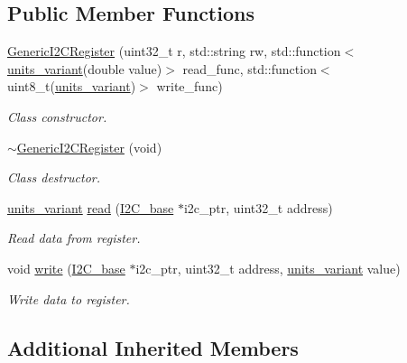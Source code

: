 \subsection*{Public Member Functions}
\begin{DoxyCompactItemize}
\item 
\hyperlink{class_generic_i2_c_register_acc3dd8df2df5532b2e30ba20c1ac8735}{Generic\+I2\+C\+Register} (uint32\+\_\+t r, std\+::string rw, std\+::function$<$ \hyperlink{units__define_8hpp_a95d46867fa79633565c288a0b4bd5408}{units\+\_\+variant}(double value)$>$ read\+\_\+func, std\+::function$<$ uint8\+\_\+t(\hyperlink{units__define_8hpp_a95d46867fa79633565c288a0b4bd5408}{units\+\_\+variant})$>$ write\+\_\+func)
\begin{DoxyCompactList}\small\item\em Class constructor. \end{DoxyCompactList}\item 
\hyperlink{class_generic_i2_c_register_a17eb3844eb23aabe6fddfcef798e692f}{$\sim$\+Generic\+I2\+C\+Register} (void)
\begin{DoxyCompactList}\small\item\em Class destructor. \end{DoxyCompactList}\item 
\hyperlink{units__define_8hpp_a95d46867fa79633565c288a0b4bd5408}{units\+\_\+variant} \hyperlink{class_generic_i2_c_register_a86c28b9c5eecacca106132e7718b2646}{read} (\hyperlink{class_i2_c__base}{I2\+C\+\_\+base} $\ast$i2c\+\_\+ptr, uint32\+\_\+t address)
\begin{DoxyCompactList}\small\item\em Read data from register. \end{DoxyCompactList}\item 
void \hyperlink{class_generic_i2_c_register_ad6f38b7b54c95e3f8502de01f6122d60}{write} (\hyperlink{class_i2_c__base}{I2\+C\+\_\+base} $\ast$i2c\+\_\+ptr, uint32\+\_\+t address, \hyperlink{units__define_8hpp_a95d46867fa79633565c288a0b4bd5408}{units\+\_\+variant} value)
\begin{DoxyCompactList}\small\item\em Write data to register. \end{DoxyCompactList}\end{DoxyCompactItemize}
\subsection*{Additional Inherited Members}



